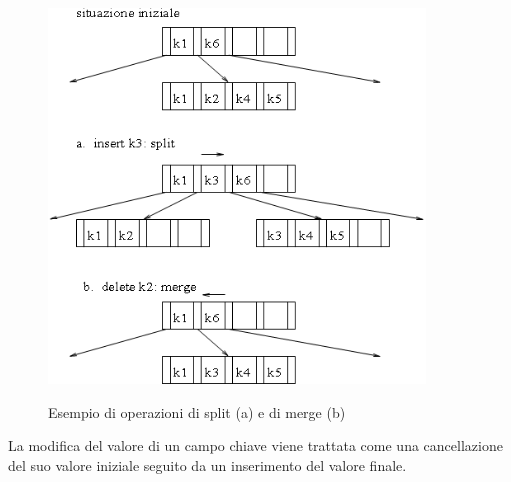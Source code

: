 \begin{figure}
  \centering
  \includegraphics[width=10cm]{img/split.png}\\
  \caption{Esempio di operazioni di split (a) e di merge (b)}\label{fig:split}
\end{figure}
La modifica del valore di un campo chiave viene trattata come una cancellazione del suo valore iniziale seguito da un inserimento del valore finale.
